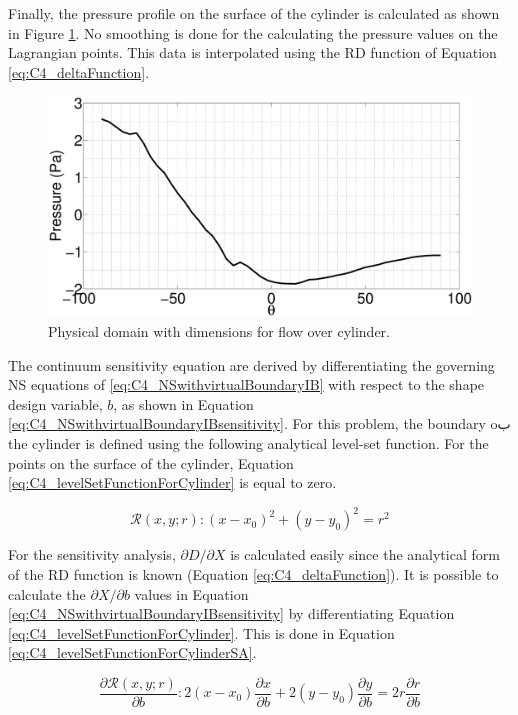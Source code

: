 Finally, the pressure profile on the surface of the cylinder is calculated as shown in Figure \ref{fig:C4_pressureOnSurfaceCylinder}. No smoothing is done for the calculating the pressure values on the Lagrangian points. This data is interpolated using the RD function of Equation \eqref{eq:C4_deltaFunction}.

\begin{figure}[H]
    \centering
    \includegraphics[width=12.00cm]{Chapter_4/figure/flow_over_cylinder/p_on_boundary_RE100.eps}
    \caption{Physical domain with dimensions for flow over cylinder.}
    \label{fig:C4_pressureOnSurfaceCylinder}
\end{figure}

The continuum sensitivity equation are derived by differentiating the governing NS equations of \eqref{eq:C4_NSwithvirtualBoundaryIB} with respect to the shape design variable, $b$, as shown in Equation \eqref{eq:C4_NSwithvirtualBoundaryIBsensitivity}. For this problem, the boundary oب the cylinder is defined using the following analytical level-set function. For the points on the surface of the cylinder, Equation \eqref{eq:C4_levelSetFunctionForCylinder} is equal to zero.

\begin{equation}\label{eq:C4_levelSetFunctionForCylinder}
	\mathcal{R}(x, y; r): (x - x_0)^2 + (y - y_0)^2 = r^2
\end{equation}

For the sensitivity analysis, $\partial D/\partial X$ is calculated easily since the analytical form of the RD function is known (Equation \eqref{eq:C4_deltaFunction}). It is possible to calculate the $\partial X/\partial b$ values in Equation \eqref{eq:C4_NSwithvirtualBoundaryIBsensitivity} by differentiating Equation \eqref{eq:C4_levelSetFunctionForCylinder}. This is done in Equation \eqref{eq:C4_levelSetFunctionForCylinderSA}.

\begin{equation}\label{eq:C4_levelSetFunctionForCylinderSA}
	\frac{\partial \mathcal{R}(x, y; r)}{\partial b}: 
	2 (x - x_0)\dfrac{\partial x}{\partial b} + 
	2 (y - y_0)\frac{\partial y}{\partial b} = 
	2 r \frac{\partial r}{\partial b}
\end{equation}

